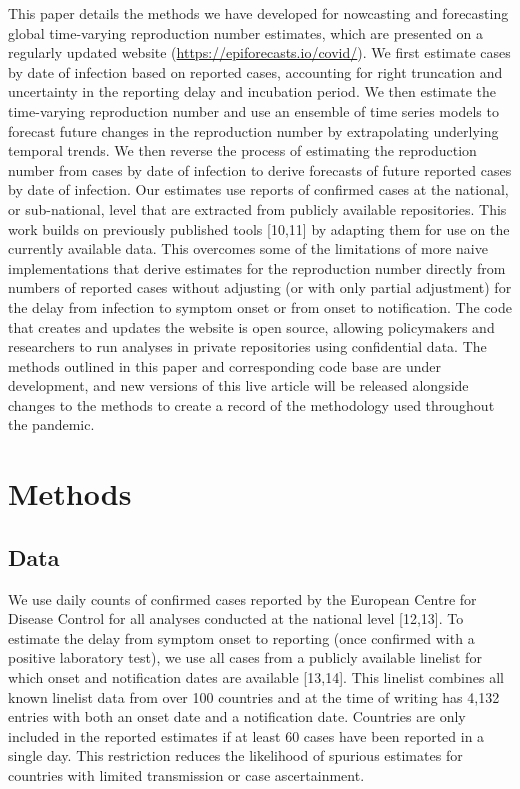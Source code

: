\documentclass[
]{article}
\begin{document}
This paper details the methods we have developed for nowcasting and
forecasting global time-varying reproduction number estimates, which are
presented on a regularly updated website
(\url{https://epiforecasts.io/covid/}). We first estimate cases by date
of infection based on reported cases, accounting for right truncation
and uncertainty in the reporting delay and incubation period. We then
estimate the time-varying reproduction number and use an ensemble of
time series models to forecast future changes in the reproduction number
by extrapolating underlying temporal trends. We then reverse the process
of estimating the reproduction number from cases by date of infection to
derive forecasts of future reported cases by date of infection. Our
estimates use reports of confirmed cases at the national, or
sub-national, level that are extracted from publicly available
repositories. This work builds on previously published tools {[}10,11{]}
by adapting them for use on the currently available data. This overcomes
some of the limitations of more naive implementations that derive
estimates for the reproduction number directly from numbers of reported
cases without adjusting (or with only partial adjustment) for the delay
from infection to symptom onset or from onset to notification. The code
that creates and updates the website is open source, allowing
policymakers and researchers to run analyses in private repositories
using confidential data. The methods outlined in this paper and
corresponding code base are under development, and new versions of this
live article will be released alongside changes to the methods to create
a record of the methodology used throughout the pandemic.

\hypertarget{methods}{%
\section{Methods}\label{methods}}

\hypertarget{data}{%
\subsection{Data}\label{data}}

We use daily counts of confirmed cases reported by the European Centre
for Disease Control for all analyses conducted at the national level
{[}12,13{]}. To estimate the delay from symptom onset to reporting (once
confirmed with a positive laboratory test), we use all cases from a
publicly available linelist for which onset and notification dates are
available {[}13,14{]}. This linelist combines all known linelist data
from over 100 countries and at the time of writing has 4,132 entries
with both an onset date and a notification date. Countries are only
included in the reported estimates if at least 60 cases have been
reported in a single day. This restriction reduces the likelihood of
spurious estimates for countries with limited transmission or case
ascertainment.
\end{document}

